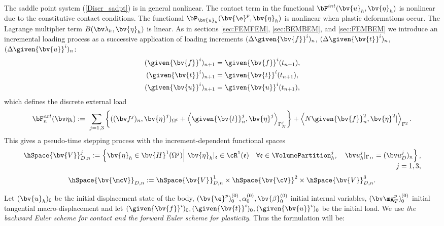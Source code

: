 The saddle point system (\ref{Discr_sadpt}) is in general nonlinear.
The contact term in the functional $\bF^{int}(\bv{u}_h,\bv{\eta}_h)$ is nonlinear due to the constitutive contact conditions. The functional $\bP_{\bv{u}_{h}} ( \bv{\e}^p,\bv{\eta}_h) $ is nonlinear when plastic deformations occur. The Lagrange multiplier term $B(\bv \lambda_h, \bv{\eta}_h)$ is linear. As in sections \ref{sec:FEMFEM}, \ref{sec:BEMBEM}, and \ref{sec:FEMBEM} we introduce an incremental loading process as a successive application of loading increments $(\Delta \given{\bv{f}}^i)_n$, $(\Delta \given{\bv{t}}^i)_n$, $(\Delta \given{\bv{u}}^i)_n$:
\begin{align*}
(\given{\bv{f}}^i)_{n+1} &= \given{\bv{f}}^i(t_{n+1}), \\
(\given{\bv{t}}^i)_{n+1} &= \given{\bv{t}}^i(t_{n+1}), \\
(\given{\bv{u}}^i)_{n+1} &= \given{\bv{u}}^i(t_{n+1}),
\end{align*}
which defines the discrete external load
\[
\bF^{ext}_{n}(\bv\eta_h) :=\,\, \sum_{j=1,3} \left\lbrace 
 ((\bv f^j)_n, \bv{\eta}^j)_{\Omega^i} 
+ \left\langle \given{\bv{t}}^j_n, \bv{\eta}^j \right\rangle_{\Gamma_N^j} \right\rbrace 
+ \left\langle N \given{\bv{f}}^2_n , \bv{\eta}^2| \right\rangle_{\Gamma^2}.
\]
This gives a pseudo-time stepping process with the increment-dependent functional spaces
\begin{equation*}
\begin{array}{r}
\hSpace{\bv{V}}^j_{D,n} := \left\lbrace \bv{\eta}_h \in \bv{H}^1(\Omega^j) \middle|~ \bv{\eta}_h|_{\mathfrak{e}} \in \cR^1(\mathfrak{e}) \quad \forall \mathfrak{e} \in \VolumePartition^j_h, \quad \bv u^j_h|_{\Gamma_D} = (\bv u^j_D)_n \right\rbrace, \\
j=1,3,
\end{array}
\end{equation*}
\[
\hSpace{\bv{\mcV}}_{D,n} := \hSpace{\bv{V}}^1_{D,n} \times \hSpace{\bv{\cV}}^2 \times \hSpace{\bv{V}}^3_{D,n}.
\]

Let $(\bv{u}_{h})_0$ be the initial displacement state of the body, $(\bv{\e}^p)^{(0)}_0, \alpha^{(0)}_0, \bv{\beta}^{(0)}_0 $ initial internal variables, $(\bv \mg^p_T)^{(0)}_0$ initial tangential macro-displacement and let $(\given{\bv{f}}^i)_0, (\given{\bv{t}}^i)_0, (\given{\bv{u}}^i)_0$ be the initial load. We use {\it the backward Euler scheme for contact and the forward Euler scheme for plasticity}. Thus the formulation will be:

